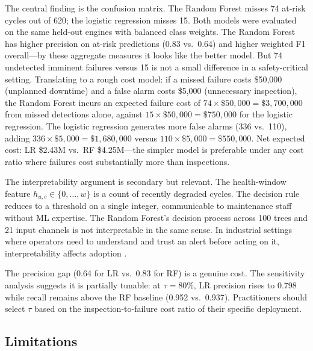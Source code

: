\documentclass[10pt,twocolumn]{article}
\begin{document}
The central finding is the confusion matrix.
The Random Forest misses 74 at-risk cycles out of 620; the logistic regression misses
15.
Both models were evaluated on the same held-out engines with balanced class weights.
The Random Forest has higher precision on at-risk predictions (0.83 vs.\ 0.64) and
higher weighted F1 overall---by these aggregate measures it looks like the better
model.
But 74 undetected imminent failures versus 15 is not a small difference in a
safety-critical setting.
Translating to a rough cost model: if a missed failure costs \$50,000 (unplanned
downtime) and a false alarm costs \$5,000 (unnecessary inspection), the Random Forest
incurs an expected failure cost of $74 \times \$50{,}000 = \$3{,}700{,}000$ from missed
detections alone, against $15 \times \$50{,}000 = \$750{,}000$ for the logistic
regression.
The logistic regression generates more false alarms (336 vs.\ 110), adding $336 \times
\$5{,}000 = \$1{,}680{,}000$ versus $110 \times \$5{,}000 = \$550{,}000$.
Net expected cost: LR \$2.43M vs.\ RF \$4.25M---the simpler model is preferable under
any cost ratio where failures cost substantially more than inspections.

The interpretability argument is secondary but relevant.
The health-window feature $h_{u,c} \in \{0,\ldots,w\}$ is a count of recently degraded
cycles.
The decision rule reduces to a threshold on a single integer, communicable to
maintenance staff without ML expertise.
The Random Forest's decision process across 100 trees and 21 input channels is not
interpretable in the same sense.
In industrial settings where operators need to understand and trust an alert before
acting on it, interpretability affects adoption \cite{jardine2006review}.

The precision gap (0.64 for LR vs.\ 0.83 for RF) is a genuine cost.
The sensitivity analysis suggests it is partially tunable: at $\tau=80\%$, LR
precision rises to 0.798 while recall remains above the RF baseline (0.952 vs.\
0.937).
Practitioners should select $\tau$ based on the inspection-to-failure cost ratio of
their specific deployment.

\subsection{Limitations}
\end{document}
